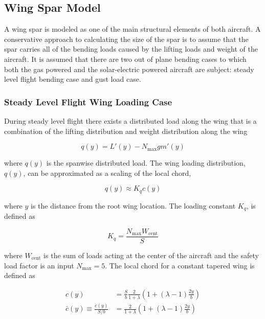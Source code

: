 \documentclass[]{aiaa-tc}%
\begin{document}
\subsection{Wing Spar Model}

A wing spar is modeled as one of the main structural elements of both aircraft. 
A conservative approach to calculating the size of the spar is to assume that the spar carries all of the bending loads caused by the lifting loads and weight of the aircraft.  
It is assumed that there are two out of plane bending cases to which both the gas powered and the solar-electric powered aircraft are subject: steady level flight bending case and gust load case. 

\subsubsection{Steady Level Flight Wing Loading Case}

During steady level flight there exists a distributed load along the wing that is a combination of the lifting distribution and weight distribution along the wing

\begin{equation}
    \label{e:wloading}
    q(y) = L'(y) - N_{\text{max}}gm'(y)
\end{equation}

where $q(y)$ is the spanwise distributed load. 
The wing loading distribution, $q(y)$, can be approximated as a scaling of the local chord,\cite{bending}

\begin{equation}
    \label{e:wingloading}
    q(y) \approx K_q c(y) 
\end{equation}

where $y$ is the distance from the root wing location. The loading constant $K_q$\cite{bending}, is defined as

\begin{equation}
    \label{e:kq}
    K_q = \frac{N_{\text{max}}W_{\text{cent}}}{S}
\end{equation}

where $W_{\text{cent}}$ is the sum of loads acting at the center of the aircraft and the safety load factor is an input $N_{\text{max}}=5$. The local chord for a constant tapered wing\cite{bending} is defined as 

\begin{align}
    \label{e:localchord}
    c(y) &= \frac{S}{b} \frac{2}{1+\lambda} \left( 1 + (\lambda - 1) \frac{2y}{b} \right) \\
    \bar{c}(y) \equiv \frac{c(y)}{S/b} &= \frac{2}{1+\lambda} \left( 1 + (\lambda - 1) \frac{2y}{b} \right)
\end{align}
\end{document}
